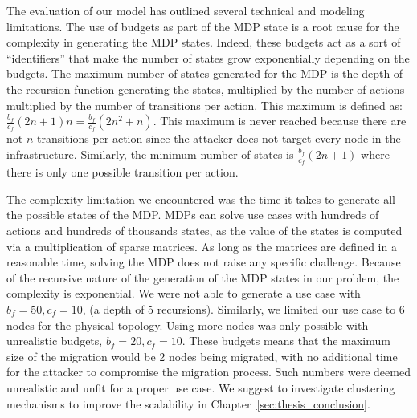 \label{sec:mdp-discussion}
The evaluation of our model has outlined several technical and modeling limitations.
The use of budgets as part of the MDP state is a root cause for the complexity in generating the MDP states. Indeed, these budgets act as a sort of ``identifiers'' that make the number of states grow exponentially depending on the budgets. The maximum number of states generated for the MDP is the depth of the recursion function generating the states, multiplied by the number of actions multiplied by the number of transitions per action. This maximum is defined as: $\frac{b_f}{c_f}(2n+1)n = \frac{b_f}{c_f}(2n^2+n)$. This maximum is never reached because there are not $n$ transitions per action since the attacker does not target every node in the infrastructure. Similarly, the minimum number of states is $\frac{b_f}{c_f}(2n+1)$ where there is only one possible transition per action. 

The complexity limitation we encountered was the time it takes to generate all the possible states of the MDP. MDPs can solve use cases with hundreds of actions and hundreds of thousands states, as the value of the states is computed via a multiplication of sparse matrices. As long as the matrices are defined in a reasonable time, solving the MDP does not raise any specific challenge.
Because of the recursive nature of the generation of the MDP states in our problem, the complexity is exponential.
We were not able to generate a use case with $b_f = 50, c_f = 10$, (\ie a depth of 5 recursions).
Similarly, we limited our use case to 6 nodes for the physical topology. Using more nodes was only possible with unrealistic budgets, \eg $b_f = 20, c_f=10$. These budgets means that the maximum size of the migration would be 2 nodes being migrated, with no additional time for the attacker to compromise the migration process. Such numbers were deemed unrealistic and unfit for a proper use case. We suggest to investigate clustering mechanisms to improve the scalability in Chapter~\ref{sec:thesis_conclusion}.

